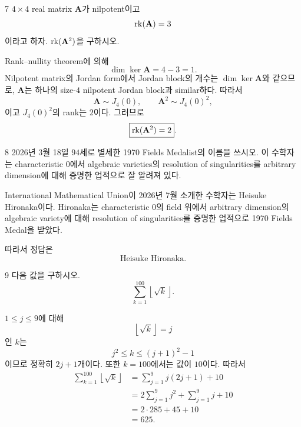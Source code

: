 \begin{problem}{7}
$4\times4$ real matrix $\mathbf{A}$가 nilpotent이고
\[
    \operatorname{rk}(\mathbf{A})=3
\]
이라고 하자. $\operatorname{rk}(\mathbf{A}^2)$을 구하시오.
\end{problem}

\begin{solution}
Rank--nullity theorem에 의해
\[
    \dim\ker\mathbf{A}=4-3=1.
\]
Nilpotent matrix의 Jordan form에서 Jordan block의 개수는 $\dim\ker\mathbf{A}$와 같으므로, $\mathbf{A}$는 하나의 size-$4$ nilpotent Jordan block과 similar하다. 따라서
\[
    \mathbf{A}\sim J_4(0),
    \qquad
    \mathbf{A}^2\sim J_4(0)^2,
\]
이고 $J_4(0)^2$의 rank는 $2$이다. 그러므로
\[
    \boxed{\operatorname{rk}(\mathbf{A}^2)=2}.
\]
\end{solution}

\begin{problem}{8}
2026년 3월 18일 $94$세로 별세한 1970 Fields Medalist의 이름을 쓰시오. 이 수학자는 characteristic $0$에서 algebraic varieties의 resolution of singularities를 arbitrary dimension에 대해 증명한 업적으로 잘 알려져 있다.
\end{problem}

\begin{solution}
International Mathematical Union이 2026년 7월 소개한 수학자는 Heisuke Hironaka이다. Hironaka는 characteristic $0$의 field 위에서 arbitrary dimension의 algebraic variety에 대해 resolution of singularities를 증명한 업적으로 1970 Fields Medal을 받았다.

따라서 정답은
\[
    \boxed{\text{Heisuke Hironaka}}.
\]
\end{solution}

\begin{problem}{9}
다음 값을 구하시오.
\[
    \sum_{k=1}^{100}\left\lfloor\sqrt{k}\right\rfloor.
\]
\end{problem}

\begin{solution}
$1\leq j\leq9$에 대해
\[
    \left\lfloor\sqrt{k}\right\rfloor=j
\]
인 $k$는
\[
    j^2\leq k\leq(j+1)^2-1
\]
이므로 정확히 $2j+1$개이다. 또한 $k=100$에서는 값이 $10$이다. 따라서
\[
    \begin{aligned}
    \sum_{k=1}^{100}\left\lfloor\sqrt{k}\right\rfloor
    &=
    \sum_{j=1}^{9}j(2j+1)+10\\
    &=
    2\sum_{j=1}^{9}j^2+\sum_{j=1}^{9}j+10\\
    &=
    2\cdot285+45+10\\
    &=\boxed{625}.
    \end{aligned}
\]
\end{solution}

